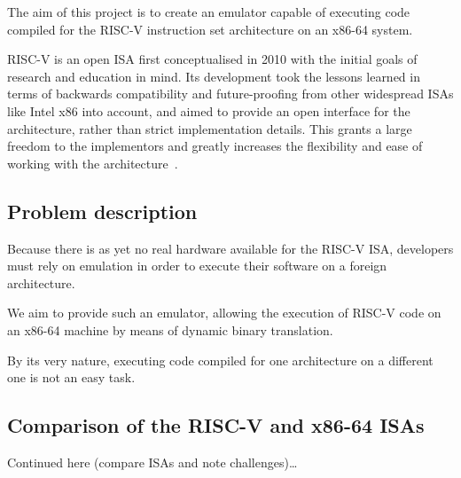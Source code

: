 The aim of this project is to create an emulator capable of executing code compiled for the RISC-V instruction set architecture on an x86-64 system.

RISC-V is an open ISA first conceptualised in 2010 with the initial goals of research and education in mind.
Its development took the lessons learned in terms of backwards compatibility and future-proofing from other widespread ISAs like Intel x86 into account, and aimed to provide an open interface for the architecture, rather than strict implementation details.
This grants a large freedom to the implementors and greatly increases the flexibility and ease of working with the architecture~\cite[S. 1f]{riscvspec}.

\subsection{Problem description}
Because there is as yet no real hardware available for the RISC-V ISA, developers must rely on emulation in order to execute their software on a foreign architecture.

We aim to provide such an emulator, allowing the execution of RISC-V code on an x86-64 machine by means of dynamic binary translation.

By its very nature, executing code compiled for one architecture on a different one is not an easy task.


\subsection{Comparison of the RISC-V and x86-64 ISAs}
\label{sec:isa-cmp}

Continued here (compare ISAs and note challenges)\ldots













